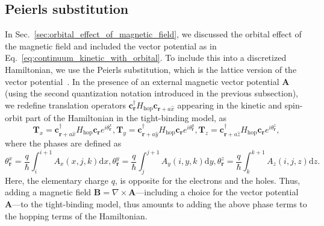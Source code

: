 \subsection{Peierls substitution}
In Sec.~\ref{sec:orbital_effect_of_magnetic_field}, we discussed the orbital effect of the magnetic field and included the vector potential as in Eq.~\eqref{eq:continuum_kinetic_with_orbital}.
To include this into a discretized Hamiltonian, we use the Peierls substitution, which is the lattice version of the vector potential~\cite{Peierls1933}.
In the presence of an external magnetic vector potential $\mathbf{A}$ (using the second quantization notation introduced in the previous subsection), we redefine translation operators $\bm{c}_{\bm{r}}^{\dagger}H_\textrm{hop}\bm{c}_{\bm{r}+a\hat{x}}$ appearing in the kinetic and spin-orbit part of the Hamiltonian in the tight-binding model, as
\begin{subequations}
\begin{equation}
\bm{T}_x = \bm{c}_{\bm{r}+a\hat{x}}^{\dagger}H_\textrm{hop}\bm{c}_{\bm{r}} e^{i \theta_{\bm{r}}^x},
\end{equation}
\begin{equation}
\bm{T}_y = \bm{c}_{\bm{r}+a\hat{y}}^{\dagger}H_\textrm{hop}\bm{c}_{\bm{r}} e^{i \theta_{\bm{r}}^y},
\end{equation}
\begin{equation}
\bm{T}_z = \bm{c}_{\bm{r}+a\hat{z}}^{\dagger}H_\textrm{hop}\bm{c}_{\bm{r}} e^{i \theta_{\bm{r}}^z},
\end{equation}
\end{subequations}
where the phases are defined as
\begin{subequations}
\begin{equation}
\theta_{\bm{r}}^{x}={\frac {q}{\hbar}} \int_{i}^{i+1}A_{x}(x,j,k){\text{d}}x,
\end{equation}
\begin{equation}
\theta_{\bm{r}}^{y}={\frac {q}{\hbar}} \int_{j}^{j+1}A_{y}(i,y,k){\text{d}}y,
\end{equation}
\begin{equation}
\theta_{\bm{r}}^{z}={\frac {q}{\hbar}} \int_{k}^{k+1}A_{z}(i,j,z){\text{d}}z.
\end{equation}
\end{subequations}
Here, the elementary charge $q$, is opposite for the electrons and the holes.
Thus, adding a magnetic field $\bm{B}=\nabla \times \bm{A}$---including a choice for the vector potential $\bm{A}$---to the tight-binding model, thus amounts to adding the above phase terms to the hopping terms of the Hamiltonian.

